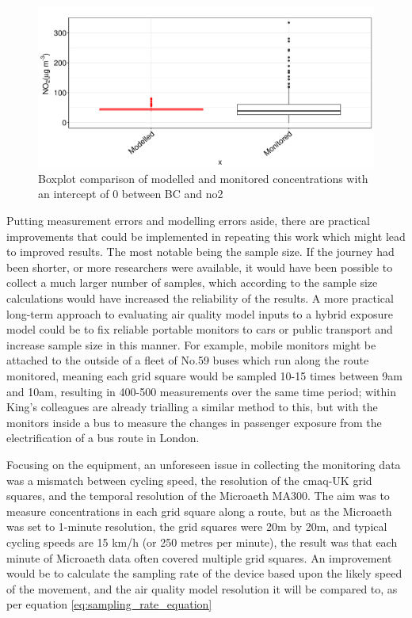 \begin{figure}[H]
\centering
\includegraphics[scale=0.6]{images/grouped_journey_boxplots_new_intercept.png}
\caption{Boxplot comparison of modelled and monitored concentrations with an intercept of 0 between BC and \gls{no2}}
\label{fig:grouped_journey_boxplots_new_intercept}
\end{figure}

Putting measurement errors and modelling errors aside, there are practical improvements that could be implemented in repeating this work which might lead to improved results. The most notable being the sample size. If the journey had been shorter, or more researchers were available, it would have been possible to collect a much larger number of samples, which according to the sample size calculations would have increased the reliability of the results. A more practical long-term approach to evaluating air quality model inputs to a hybrid exposure model could be to fix reliable portable monitors to cars or public transport and increase sample size in this manner. For example, mobile monitors might be attached to the outside of a fleet of No.59 buses which run along the route monitored, meaning each grid square would be sampled 10-15 times between 9am and 10am, resulting in 400-500 measurements over the same time period; within King's colleagues are already trialling a similar method to this, but with the monitors inside a bus to measure the changes in passenger exposure from the electrification of a bus route in London.

Focusing on the equipment, an unforeseen issue in collecting the monitoring data was a mismatch between cycling speed, the resolution of the \gls{cmaq}-UK grid squares, and the temporal resolution of the Microaeth MA300. The aim was to measure concentrations in each grid square along a route, but as the Microaeth was set to 1-minute resolution, the grid squares were 20m by 20m, and typical cycling speeds are 15 km/h (or 250 metres per minute), the result was that each minute of Microaeth data often covered multiple grid squares. An improvement would be to calculate the sampling rate of the device based upon the likely speed of the movement, and the air quality model resolution it will be compared to, as per equation \ref{eq:sampling_rate_equation}

